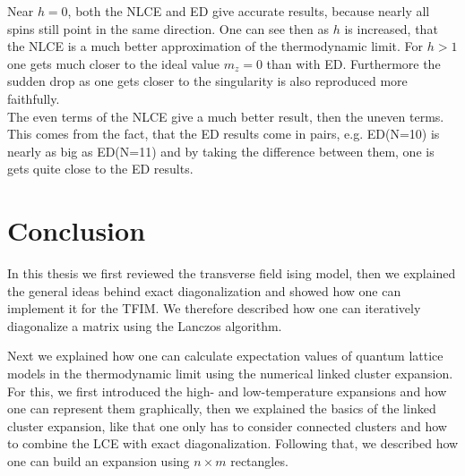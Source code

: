 \documentclass{article}
\begin{document}
Near $h = 0$, both the NLCE and ED give accurate results, because
nearly all spins still point in the same direction. One can see then as $h$ is
increased, that the NLCE is a much better approximation of the
thermodynamic limit. For $h>1$ one gets much closer to the ideal value
$m_z = 0$ than with ED. Furthermore the sudden drop as one gets closer
to the singularity is also reproduced more faithfully.\\
The even terms of the NLCE give a much better result, then the uneven
terms. This comes from the fact, that the ED results come in pairs,
e.g. ED(N=10) is nearly as big as ED(N=11) and by taking the
difference between them, one is gets quite close to the ED results.












\section{Conclusion}
In this thesis we first reviewed the transverse field ising model,
then we explained the general ideas behind exact diagonalization and
showed how one can implement it for the TFIM. We therefore described
how one can iteratively diagonalize a matrix using the Lanczos
algorithm.

Next we explained how one can calculate expectation values of quantum
lattice models in the thermodynamic limit using the numerical linked
cluster expansion. For this, we first introduced the high- and
low-temperature expansions and how one can represent them graphically,
then we explained the basics of the linked cluster expansion, like
that one only has to consider connected clusters and how to combine
the LCE with exact diagonalization. Following that, we
described how one can build an expansion using $n \times m$
rectangles.
\end{document}
